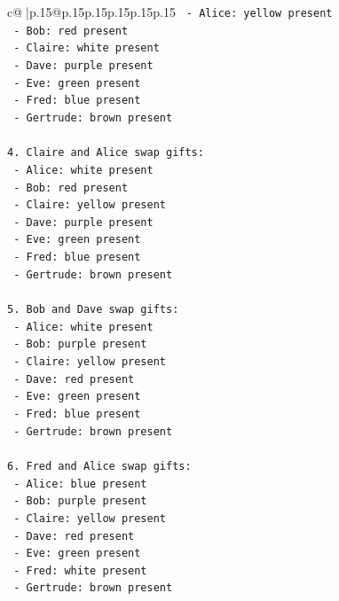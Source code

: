 \documentclass{article}
\begin{document}
{\begin{supertabular}{c@{$\;$}|p{.15\linewidth}@{}p{.15\linewidth}p{.15\linewidth}p{.15\linewidth}p{.15\linewidth}p{.15\linewidth}}
{{{\texttt{   {-} Alice: yellow present} \\
\texttt{   {-} Bob: red present} \\
\texttt{   {-} Claire: white present} \\
\texttt{   {-} Dave: purple present} \\
\texttt{   {-} Eve: green present} \\
\texttt{   {-} Fred: blue present} \\
\texttt{   {-} Gertrude: brown present} \\
\\ 
\texttt{4. Claire and Alice swap gifts: } \\
\texttt{   {-} Alice: white present} \\
\texttt{   {-} Bob: red present} \\
\texttt{   {-} Claire: yellow present} \\
\texttt{   {-} Dave: purple present} \\
\texttt{   {-} Eve: green present} \\
\texttt{   {-} Fred: blue present} \\
\texttt{   {-} Gertrude: brown present} \\
\\ 
\texttt{5. Bob and Dave swap gifts: } \\
\texttt{   {-} Alice: white present} \\
\texttt{   {-} Bob: purple present} \\
\texttt{   {-} Claire: yellow present} \\
\texttt{   {-} Dave: red present} \\
\texttt{   {-} Eve: green present} \\
\texttt{   {-} Fred: blue present} \\
\texttt{   {-} Gertrude: brown present} \\
\\ 
\texttt{6. Fred and Alice swap gifts: } \\
\texttt{   {-} Alice: blue present} \\
\texttt{   {-} Bob: purple present} \\
\texttt{   {-} Claire: yellow present} \\
\texttt{   {-} Dave: red present} \\
\texttt{   {-} Eve: green present} \\
\texttt{   {-} Fred: white present} \\
\texttt{   {-} Gertrude: brown present} \\
}}}
\end{supertabular}}
\end{document}
